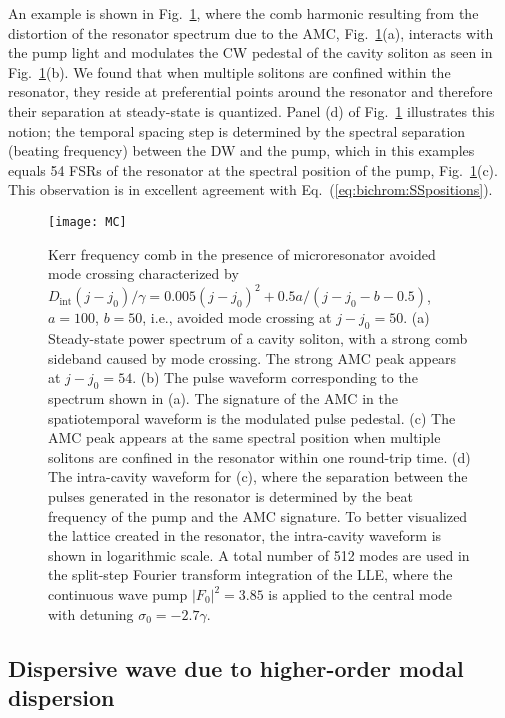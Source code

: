 An example is shown in Fig.~\ref{fig:figMC}, where the comb harmonic resulting from the distortion of the resonator spectrum due to the AMC, Fig.~\ref{fig:figMC}(a), interacts with the pump light and modulates the CW pedestal of the cavity soliton as seen in Fig.~\ref{fig:figMC}(b). We found that when multiple solitons are confined within the resonator, they reside at preferential points around the resonator and therefore their separation at steady-state is quantized. Panel (d) of Fig.~\ref{fig:figMC} illustrates this notion; the temporal spacing step is determined by the spectral separation (beating frequency) between the DW and the pump, which in this examples equals 54 FSRs of the resonator at the spectral position of the pump, Fig.~\ref{fig:figMC}(c). This observation is in excellent agreement with Eq.~(\ref{eq:bichrom:SSpositions}).
%
\begin{figure}[tbp]
  \centering
  \texttt{[image: MC]}
\caption{ \small Kerr frequency comb in the presence of microresonator avoided mode crossing characterized by $D_\mathrm{int}(j-j_0)/\gamma=0.005(j - j_0)^2 + 0.5 a / (j - j_0 - b - 0.5)$, $a = 100$, $b = 50$, i.e., avoided mode crossing at $j - j_0 = 50$. (a) Steady-state power spectrum of a cavity soliton, with a strong comb sideband caused by mode crossing. The strong AMC peak appears at $j - j_0 = 54$. (b) The pulse waveform corresponding to the spectrum shown in (a). The signature of the AMC in the spatiotemporal waveform is the modulated pulse pedestal. (c) The AMC peak appears at the same spectral position when multiple solitons are confined in the resonator within one round-trip time. (d) The intra-cavity waveform for (c), where the separation between the pulses generated in the resonator is determined by the beat frequency of the pump and the AMC signature. To better visualized the lattice created in the resonator, the intra-cavity waveform is shown in logarithmic scale. A total number of 512 modes are used in the split-step Fourier transform integration of the LLE, where the continuous wave pump $|F_0|^2=3.85$ is applied to the central mode with detuning $\sigma_0 = -2.7 \gamma$.
} \label{fig:figMC}
\end{figure}
%


\subsection{Dispersive wave due to higher-order modal dispersion}

